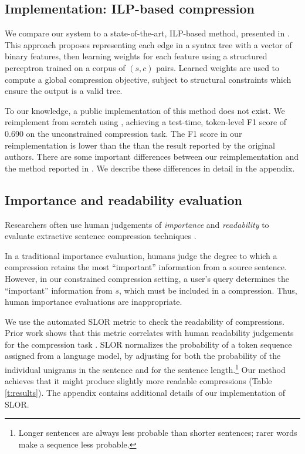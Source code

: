 \documentclass[11pt,a4paper]{article}
\begin{document}
\subsection{Implementation: ILP-based compression}\label{s:ilp}

We compare our system to a state-of-the-art, ILP-based method, presented in \citet{filippova2013overcoming}. This approach proposes representing each edge in a syntax tree with a vector of binary features, then learning weights for each feature using a structured perceptron trained on a corpus of $(s,c)$ pairs. Learned weights are used to compute a global compression objective, subject to structural constraints which ensure the output is a valid tree.

To our knowledge, a public implementation of this method does not exist. We reimplement from scratch using \citet{gurobi}, achieving a test-time, token-level F1 score of  0.690 on the unconstrained compression task. The F1 score in our reimplementation is lower than the than the result reported by the original authors. There are some important differences between our reimplementation and the method reported in \citet{filippova2013overcoming}. We describe these differences in detail in the appendix.

\subsection{Importance and readability evaluation}\label{s:readabilityinformativeness}

Researchers often use human judgements of \textit{importance} and \textit{readability} to evaluate extractive sentence compression techniques \cite{Knight2000StatisticsBasedS,clarke2008global,filippova2015sentence}. 

In a traditional importance evaluation, humans judge the degree to which a compression retains the most ``important'' information from a source sentence. However, in our constrained compression setting, a user's query determines the ``important'' information from $s$, which must be included in a compression. Thus, human importance evaluations are inappropriate.
 
We use the automated SLOR metric \cite{lau2015unsupervised} to check the readability of compressions. Prior work shows that this metric correlates with human readability judgements for the compression task \cite{kannConl}. SLOR normalizes the probability of a token sequence assigned from a language model, by adjusting for both the probability of the individual unigrams in the sentence and for the sentence length.\footnote{Longer sentences are always less probable than shorter sentences; rarer words make a sequence less probable.} Our method achieves that it might produce slightly more readable compressions (Table \ref{t:results}). The appendix contains additional details of our implementation of SLOR. 
\end{document}
